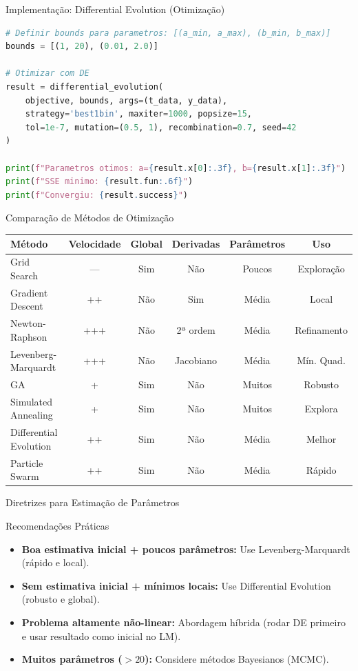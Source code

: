 \begin{frame}[fragile]{Implementação: Differential Evolution (Otimização)}
\begin{lstlisting}[language=Python, caption=Otimizacao global usando scipy, basicstyle=\ttfamily\scriptsize]
# Definir bounds para parametros: [(a_min, a_max), (b_min, b_max)]
bounds = [(1, 20), (0.01, 2.0)]

# Otimizar com DE
result = differential_evolution(
    objective, bounds, args=(t_data, y_data),
    strategy='best1bin', maxiter=1000, popsize=15,
    tol=1e-7, mutation=(0.5, 1), recombination=0.7, seed=42
)

print(f"Parametros otimos: a={result.x[0]:.3f}, b={result.x[1]:.3f}")
print(f"SSE minimo: {result.fun:.6f}")
print(f"Convergiu: {result.success}")
\end{lstlisting}
\end{frame}

\begin{frame}{Comparação de Métodos de Otimização}
\begin{center}
\footnotesize
\begin{tabular}{lccccc}
\toprule
\textbf{Método} & \textbf{Velocidade} & \textbf{Global} & \textbf{Derivadas} & \textbf{Parâmetros} & \textbf{Uso} \\
\midrule
Grid Search & --- & Sim & Não & Poucos & Exploração \\
Gradient Descent & ++ & Não & Sim & Média & Local \\
Newton-Raphson & +++ & Não & 2ª ordem & Média & Refinamento \\
Levenberg-Marquardt & +++ & Não & Jacobiano & Média & Mín. Quad. \\
\midrule
GA & + & Sim & Não & Muitos & Robusto \\
Simulated Annealing & + & Sim & Não & Muitos & Explora \\
Differential Evolution & ++ & Sim & Não & Média & Melhor \\
Particle Swarm & ++ & Sim & Não & Média & Rápido \\
\bottomrule
\end{tabular}
\end{center}
\end{frame}

\begin{frame}{Diretrizes para Estimação de Parâmetros}
\begin{exampleblock}{Recomendações Práticas}
\begin{itemize}
    \item \textbf{Boa estimativa inicial + poucos parâmetros:} Use Levenberg-Marquardt (rápido e local).
    \item \textbf{Sem estimativa inicial + mínimos locais:} Use Differential Evolution (robusto e global).
    \item \textbf{Problema altamente não-linear:} Abordagem híbrida (rodar DE primeiro e usar resultado como inicial no LM).
    \item \textbf{Muitos parâmetros ($>20$):} Considere métodos Bayesianos (MCMC).
\end{itemize}
\end{exampleblock}
\end{frame}

